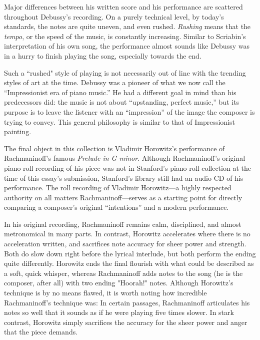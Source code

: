 \documentclass[titlepage,14pt]{article}
\begin{document}
\begin{doublespace}
Major differences between his written score and his performance are scattered throughout Debussy's recording. On a purely technical level, by today's standards, the notes are quite uneven, and even rushed. \textit{Rushing} means that the \textit{tempo}, or the speed of the music, is constantly increasing.
Similar to Scriabin's interpretation of his own song, the performance almost sounds like Debussy was in a hurry to finish playing the song, especially towards the end.

Such a ``rushed" style of playing is not necessarily out of line with the trending styles of art at the time. Debussy was a pioneer of what we now call the ``Impressionist era of piano music.'' He had a different goal in mind than his predecessors did: the music is not about ``upstanding, perfect music,'' but its purpose is to leave the listener with an ``impression'' of the image the composer is trying to convey. This general philosophy is similar to that of Impressionist painting.

The final object in this collection is Vladimir Horowitz's performance of Rachmaninoff's famous \textit{Prelude in G minor}. \autocite{horowitz} Although Rachmaninoff's original piano roll recording of his piece was not in Stanford's piano roll collection at the time of this essay's submission, Stanford's library still had an audio CD of his performance.\autocite{rachmaninoff} The roll recording of Vladimir Horowitz---a highly respected authority on all matters Rachmaninoff---serves as a starting point for directly comparing a composer's original ``intentions'' and a modern performance.

In his original recording, Rachmaninoff remains calm, disciplined, and almost metronomical in many parts. \autocite{rachmaninoff} In contrast, Horowitz accelerates where there is no acceleration written, and sacrifices note accuracy for sheer power and strength. \autocite{horowitz} Both do slow down right before the lyrical interlude, but both perform the ending quite differently. Horowitz ends the final flourish with what could be described as a soft, quick whisper, whereas Rachmaninoff adds notes to the song (he is the composer, after all) with two ending "Hoorah!" notes. Although Horowitz's technique is by no means flawed, it is worth noting how incredible Rachmaninoff's technique was: In certain passages, Rachmaninoff articulates his notes so well that it sounds as if he were playing five times slower. In stark contrast, Horowitz simply sacrifices the accuracy for the sheer power and anger that the piece demands.


\end{doublespace}
\end{document}
